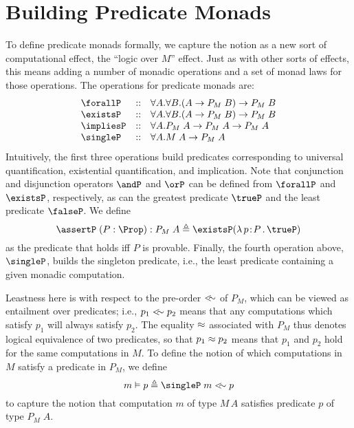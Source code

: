 \documentclass[preprint]{sigplanconf}
\begin{document}
\section{Building Predicate Monads}

To define predicate monads formally, we capture the notion as a new sort of
computational effect, the ``logic over $M$'' effect. Just as with other sorts of
effects, this means adding a number of monadic operations and a set of monad
laws for those operations. The operations for predicate monads are:
\[
\begin{array}{lcl}
  \forallP & :: & \forall A.\forall B.(A\to P_M\;B) \to P_M\;B\\
  \existsP & :: & \forall A.\forall B.(A\to P_M\;B) \to P_M\;B\\
  \impliesP & :: & \forall A.P_M\;A \to P_M\;A \to P_M\;A\\
  \singleP & :: & \forall A.M\;A \to P_M\;A\\
\end{array}
\]
Intuitively, the first three operations build predicates corresponding to
universal quantification, existential quantification, and implication. Note that
conjunction and disjunction operators $\andP$ and $\orP$ can be defined from
$\forallP$ and $\existsP$, respectively, as can the greatest predicate $\trueP$
and the least predicate $\falseP$. We define
\[
\assertP\;(P:\Prop) : P_M\;A \triangleq \existsP (\lamabs{p}{P}{\trueP})
\]
as the predicate that holds iff $P$ is provable.  Finally, the fourth operation
above, $\singleP$, builds the singleton predicate, i.e., the least predicate
containing a given monadic computation.

Leastness here is with respect to the pre-order $<\!\!\sim$ of $P_M$, which can be
viewed as entailment over predicates; i.e., $p_1<\!\!\sim p_2$ means that any
computations which satisfy $p_1$ will always satisfy $p_2$. The equality $\approx$
associated with $P_M$ thus denotes logical equivalence of two predicates, so
that $p_1\approx p_2$ means that $p_1$ and $p_2$ hold for the same computations in
$M$. To define the notion of which computations in $M$ satisfy a predicate in
$P_M$, we define
\[
m \vDash p \triangleq \singleP\;m \lrleq p
\]
to capture the notion that computation $m$ of type $M\,A$ satisfies predicate
$p$ of type $P_M\;A$.
\end{document}
